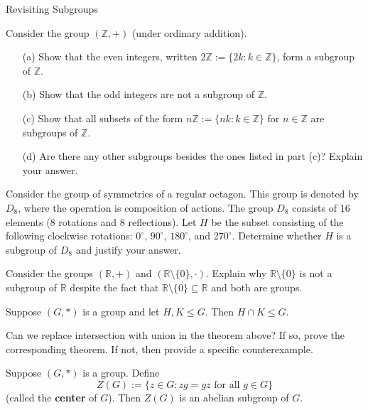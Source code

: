 \begin{section}{Revisiting Subgroups}
\begin{exercise}\label{exer:nZ}
Consider the group $(\mathbb{Z},+)$ (under ordinary addition).
\begin{enumerate}
\item[(a)] Show that the even integers, written $2\mathbb{Z}:=\{2k:k\in\mathbb{Z}\}$, form a subgroup of $\mathbb{Z}$.
\item[(b)] Show that the odd integers are not a subgroup of $\mathbb{Z}$.
\item[(c)] Show that all subsets of the form $n\mathbb{Z}:=\{nk:k\in\mathbb{Z}\}$ for $n\in\mathbb{Z}$ are subgroups of $\mathbb{Z}$.
\item[(d)] Are there any other subgroups besides the ones listed in part (c)?  Explain your answer.
\end{enumerate}
\end{exercise}

\begin{exercise}
Consider the group of symmetries of a regular octagon.  This group is denoted by $D_8$, where the operation is composition of actions.  The group $D_8$ consists of 16 elements (8 rotations and 8 reflections).  Let $H$ be the subset consisting of the following clockwise rotations: $0^\circ$, $90^\circ$, $180^\circ$, and $270^\circ$.  Determine whether $H$ is a subgroup of $D_8$ and justify your answer.
\end{exercise}

\begin{exercise}
Consider the groups $(\mathbb{R},+)$ and $(\mathbb{R}\setminus\{0\},\cdot)$.  Explain why $\mathbb{R}\setminus\{0\}$ is not a subgroup of $\mathbb{R}$ despite the fact that $\mathbb{R}\setminus\{0\}\subseteq\mathbb{R}$ and both are groups.
\end{exercise}

\begin{theorem}
Suppose $(G,*)$ is a group and let $H,K\leq G$.  Then $H\cap K\leq G$.
\end{theorem}

\begin{problem}
Can we replace intersection with union in the theorem above?  If so, prove the corresponding theorem.  If not, then provide a specific counterexample.
\end{problem}

\begin{theorem}
Suppose $(G,*)$ is a group.  Define
\[
Z(G):=\{z\in G:zg=gz\text{ for all } g\in G\}
\]
(called the \textbf{center} of $G$).  Then $Z(G)$ is an abelian subgroup of $G$.
\end{theorem}


\end{section}
